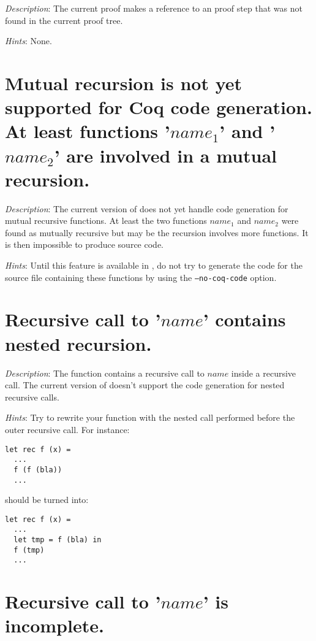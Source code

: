 {\em Description}: The current proof makes a reference to an
proof step that was not found in the current proof tree.

{\em Hints}: None.


\section*{Mutual recursion is not yet supported for Coq code
  generation. At least functions '$name_1$' and '$name_2$' are
  involved in a mutual recursion.}

{\em Description}: The current version of {\focal} does not yet handle
{\coq} code generation for mutual recursive functions. At least the two
functions $name_1$ and $name_2$ were found as mutually recursive but
may be the recursion involves more functions. It is then impossible to
produce {\coq} source code.


{\em Hints}: Until this feature is available in {\focal}, do not try to
generate the {\coq} code for the source file containing these functions
by using the {\tt --no-coq-code} option.


\section*{Recursive call to '$name$' contains nested recursion.}

{\em Description}: The function contains a recursive call to $name$
inside a recursive call. The current version of {\focal} doesn't
support the {\coq} code generation for nested recursive calls.

{\em Hints}: Try to rewrite your function with the nested call
performed before the outer recursive call. For instance:
{\scriptsize
\begin{lstlisting}
let rec f (x) =
  ...
  f (f (bla))
  ...
\end{lstlisting}
}
should be turned into:
{\scriptsize
\begin{lstlisting}
let rec f (x) =
  ...
  let tmp = f (bla) in
  f (tmp)
  ...
\end{lstlisting}
}



\section*{Recursive call to '$name$' is incomplete.}

